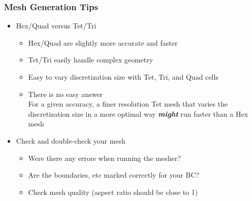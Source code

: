 \documentclass[aspectratio=169]{beamer}
\begin{document}
\begin{frame}
  \frametitle{Mesh Generation Tips}
 
  \begin{itemize}
  \item Hex/Quad versus Tet/Tri
    \begin{itemize}
    \item Hex/Quad are slightly more accurate and faster
    \item Tet/Tri easily handle complex geometry
    \item Easy to vary discretization size with Tet, Tri, and Quad cells
    \item There is no easy answer\\
      For a given accuracy, a finer resolution Tet mesh that varies
      the discretization size in a more optimal way {\bf\it might} run
      faster than a Hex mesh
    \end{itemize}
  \item Check and double-check your mesh
    \begin{itemize}
    \item Were there any errors when running the mesher?
    \item Are the boundaries, etc marked correctly for your BC?
    \item Check mesh quality (aspect ratio should be close to 1)
    \end{itemize}
  \end{itemize}

\end{frame}
\end{document}
